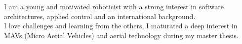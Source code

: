 

\begin{cvparagraph}

I am a young and motivated roboticist with a strong interest in software architectures, applied control and an international background.\\
I love challenges and learning from the others, I maturated a deep interest in MAVs (Micro Aerial Vehicles) and aerial technology during my master thesis.
\end{cvparagraph}
